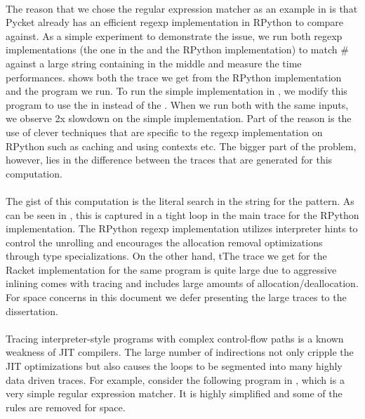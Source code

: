 			\paragraph{}%
			The reason that we chose the regular expression matcher as an example
			in  is that Pycket already has an efficient regexp
			implementation in RPython to compare against. As a simple experiment
			to demonstrate the issue, we run both regexp implementations (the one
			in the  and the RPython implementation) to match
			$\mathtt{\#}$ against a large string containing
			 in the middle and measure the time
			performances.  shows both the trace we get
			from the RPython implementation and the program we run. To run the
			simple implementation in , we modify this program
			to use the  in instead of the
			. When we run both with the same inputs, we
			observe 2x slowdown on the simple implementation. Part of the reason
			is the use of clever techniques that are specific to the regexp
			implementation on RPython such as caching and using contexts etc. The
			bigger part of the problem, however, lies in the difference between
			the traces that are generated for this computation.

			\paragraph{}%
			The gist of this computation is the literal search in the string for
			the  pattern. As can be seen in
			, this is captured in a tight loop in the
			main trace for the RPython implementation. The RPython regexp
			implementation utilizes interpreter hints to control the unrolling and
			encourages the allocation removal optimizations through type
			specializations. On the other hand, tThe trace we get for the Racket
			implementation for the same program is quite large due to aggressive
			inlining comes with tracing and includes large amounts of
			allocation/deallocation. For space concerns in this document we defer
			presenting the large traces to the dissertation.

			\paragraph{}%
			Tracing interpreter-style programs with complex control-flow paths is
			a known weakness of JIT compilers. The large number of indirections
			not only cripple the JIT optimizations but also causes the loops to be
			segmented into many highly data driven traces. For
			example, consider the following program in , which
			is a very simple regular expression matcher. It is highly simplified
			and some of the rules are removed for space.

